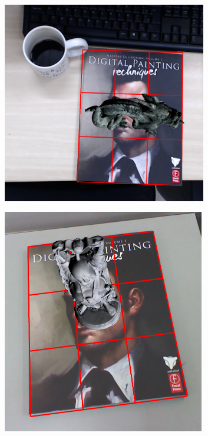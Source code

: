 \documentclass[annual]{acmsiggraph}
\begin{document}
\begin{figure}[t]
	\begin{subfigure}[c]{0.2\textwidth} \includegraphics[width=0.98\textwidth]{images/res_web1_cut5.png} \end{subfigure}%
	\vspace{0.005\textwidth}
	\begin{subfigure}[c]{0.24\textwidth} \includegraphics[width=0.97\textwidth]{images/resBuddha1.png} \end{subfigure}%

\end{figure}
\end{document}
